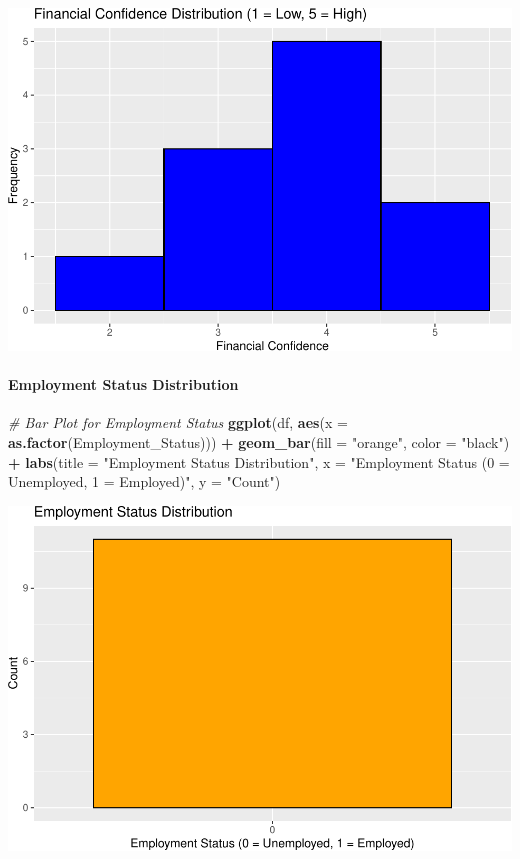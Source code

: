 \documentclass[
]{article}
\newenvironment{Shaded}{\begin{snugshade}}{\end{snugshade}}
\newcommand{\AttributeTok}[1]{\textcolor[rgb]{0.13,0.29,0.53}{#1}}
\newcommand{\CommentTok}[1]{\textcolor[rgb]{0.56,0.35,0.01}{\textit{#1}}}
\newcommand{\FunctionTok}[1]{\textcolor[rgb]{0.13,0.29,0.53}{\textbf{#1}}}
\newcommand{\NormalTok}[1]{#1}
\newcommand{\SpecialCharTok}[1]{\textcolor[rgb]{0.81,0.36,0.00}{\textbf{#1}}}
\newcommand{\StringTok}[1]{\textcolor[rgb]{0.31,0.60,0.02}{#1}}
\begin{document}
\includegraphics{Project1_files/figure-latex/unnamed-chunk-6-1.pdf}

\paragraph{Employment Status
Distribution}\label{employment-status-distribution}

\begin{Shaded}
\begin{Highlighting}[]
\CommentTok{\# Bar Plot for Employment Status}
\FunctionTok{ggplot}\NormalTok{(df, }\FunctionTok{aes}\NormalTok{(}\AttributeTok{x =} \FunctionTok{as.factor}\NormalTok{(Employment\_Status))) }\SpecialCharTok{+}
  \FunctionTok{geom\_bar}\NormalTok{(}\AttributeTok{fill =} \StringTok{"orange"}\NormalTok{, }\AttributeTok{color =} \StringTok{"black"}\NormalTok{) }\SpecialCharTok{+}
  \FunctionTok{labs}\NormalTok{(}\AttributeTok{title =} \StringTok{"Employment Status Distribution"}\NormalTok{, }\AttributeTok{x =} \StringTok{"Employment Status (0 = Unemployed, 1 = Employed)"}\NormalTok{, }\AttributeTok{y =} \StringTok{"Count"}\NormalTok{)}
\end{Highlighting}
\end{Shaded}

\includegraphics{Project1_files/figure-latex/unnamed-chunk-7-1.pdf}
\end{document}
